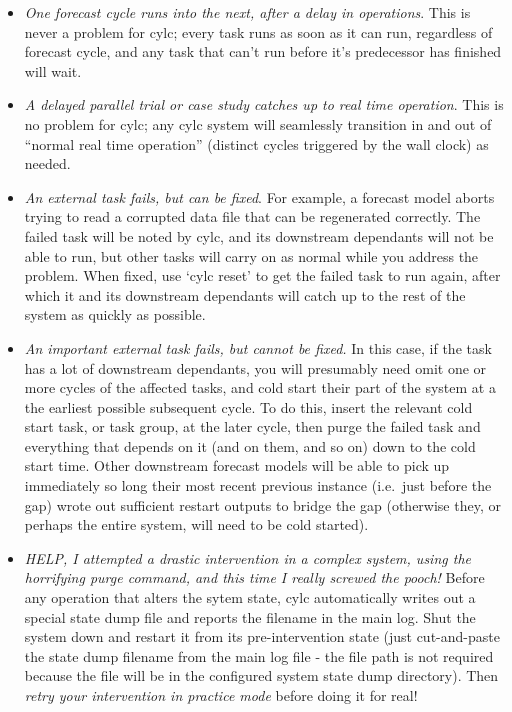 \documentclass[11pt,a4paper]{article}
\begin{document}
\begin{itemize}
    \item {\em One forecast cycle runs into the next, after a delay in
        operations}. This is never a problem for cylc; every task runs
        as soon as it can run, regardless of forecast cycle, and any
        task that can't run before it's predecessor has finished will
        wait.

    \item {\em A delayed parallel trial or case study catches up to real
        time operation}. This is no problem for cylc; any cylc system
        will seamlessly transition in and out of ``normal real time
        operation'' (distinct cycles triggered by the wall clock) as needed.

    \item {\em An external task fails, but can be fixed}. For example, a
        forecast model aborts trying to read a corrupted data file that
        can be regenerated correctly. The failed task will be noted by
        cylc, and its downstream dependants will not be able to run,
        but other tasks will carry on as normal while you address the
        problem. When fixed, use `cylc reset' to get the failed task to
        run again, after which it and its downstream dependants will
        catch up to the rest of the system as quickly as possible.

    \item {\em An important external task fails, but cannot be fixed.}
        In this case, if the task has a lot of downstream dependants,
        you will presumably need omit one or more cycles of the affected
        tasks, and cold start their part of the system at a the earliest
        possible subsequent cycle.  To do this, insert the relevant cold
        start task, or task group, at the later cycle, then purge the
        failed task and everything that depends on it (and on them, and
        so on) down to the cold start time.  Other downstream forecast
        models will be able to pick up immediately so long their most
        recent previous instance (i.e.\ just before the gap) wrote out
        sufficient restart outputs to bridge the gap (otherwise they,
        or perhaps the entire system, will need to be cold started). 

    \item {\em HELP, I attempted a drastic intervention in a complex
        system, using the horrifying purge command, and this time I
        really screwed the pooch!} Before any operation that alters the
        sytem state, cylc automatically writes out a special state dump
        file and reports the filename in the main log. Shut the system
        down and restart it from its pre-intervention state (just
        cut-and-paste the state dump filename from the main log file -
        the file path is not required because the file will be in the
        configured system state dump directory).  Then {\em retry your
        intervention in practice mode} before doing it for real!

\end{itemize}
\end{document}
